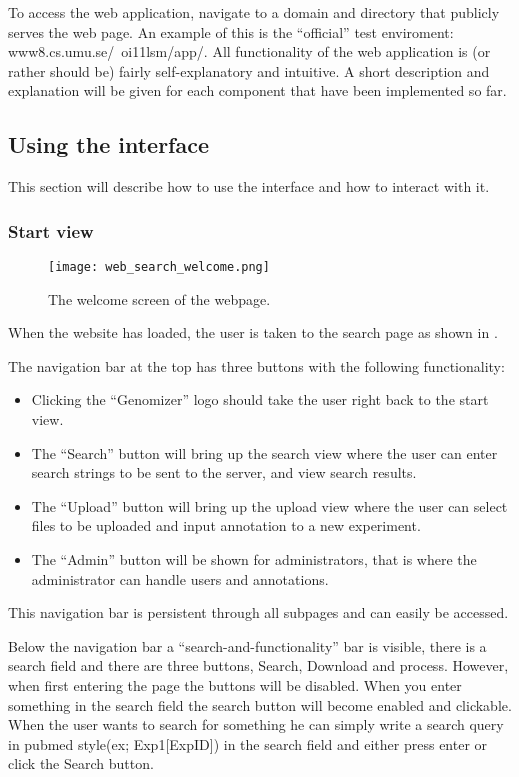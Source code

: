 To access the web application, navigate to a domain and directory that publicly serves the web page. An example of this is the “official” test enviroment: www8.cs.umu.se/~oi11lsm/app/.
All functionality of the web application is (or rather should be) fairly self-explanatory and intuitive. A short description and explanation will be given for each component that have been implemented so far.
\subsection{Using the interface}
This section will describe how to use the interface and how to interact with it.
\subsubsection{Start view}
\begin{figure}[h]
\centering
\texttt{[image: web\_search\_welcome.png]}
\caption{\label{fig:web_search_welcome} The welcome screen of the webpage.}
\end{figure}

When the website has loaded, the user is taken to the search page as shown in .

The navigation bar at the top has three buttons with the following functionality:
\begin{itemize}
	\item Clicking the “Genomizer” logo should take the user right back to the start view.
	\item The “Search” button will bring up the search view where the user can enter search strings to be sent to the server, and view search results.
	\item The “Upload” button will bring up the upload view where the user can select files to be uploaded and input annotation to a new experiment.
	\item The “Admin” button will be shown for administrators, that is where the administrator can handle users and annotations.
\end{itemize}
This navigation bar is persistent through all subpages and can easily be accessed.

Below the navigation bar a “search-and-functionality” bar is visible, there is a search field and there are three buttons, Search, Download and process. However, when first entering the page the buttons will be disabled. When you enter something in the search field the search button will become enabled and clickable. 
When the user wants to search for something he can simply write a search query in pubmed style(ex; Exp1[ExpID]) in the search field and either press enter or click the Search button. 

